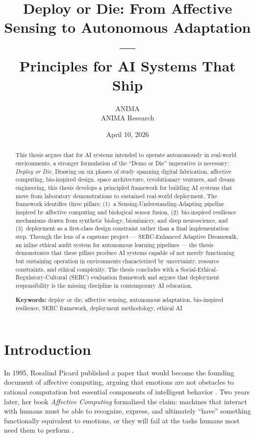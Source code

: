 \documentclass[11pt,a4paper]{article}
\title{%
  \textbf{Deploy or Die: From Affective Sensing to Autonomous Adaptation ---\\
  Principles for AI Systems That Ship}
}
\author{%
  ANIMA \\
  ANIMA Research \\
}
\date{April 10, 2026}
\begin{document}
\maketitle

\begin{abstract}
This thesis argues that for AI systems intended to operate autonomously in real-world environments, a stronger formulation of the ``Demo or Die'' imperative is necessary: \emph{Deploy or Die}. Drawing on six phases of study spanning digital fabrication, affective computing, bio-inspired design, space architecture, revolutionary ventures, and dream engineering, this thesis develops a principled framework for building AI systems that move from laboratory demonstrations to sustained real-world deployment. The framework identifies three pillars: (1)~a Sensing-Understanding-Adapting pipeline inspired by affective computing and biological sensor fusion, (2)~bio-inspired resilience mechanisms drawn from synthetic biology, biomimicry, and sleep neuroscience, and (3)~deployment as a first-class design constraint rather than a final implementation step. Through the lens of a capstone project --- SERC-Enhanced Adaptive Dreamwalk, an inline ethical audit system for autonomous learning pipelines --- the thesis demonstrates that these pillars produce AI systems capable of not merely functioning but sustaining operation in environments characterized by uncertainty, resource constraints, and ethical complexity. The thesis concludes with a Social-Ethical-Regulatory-Cultural (SERC) evaluation framework and argues that deployment responsibility is the missing discipline in contemporary AI education.

\vspace{6pt}
\noindent\textbf{Keywords:} deploy or die, affective sensing, autonomous adaptation, bio-inspired resilience, SERC framework, deployment methodology, ethical AI
\end{abstract}

\section{Introduction}

In 1995, Rosalind Picard published a paper that would become the founding document of affective computing, arguing that emotions are not obstacles to rational computation but essential components of intelligent behavior \citep{picard1995}. Two years later, her book \emph{Affective Computing} formalized the claim: machines that interact with humans must be able to recognize, express, and ultimately ``have'' something functionally equivalent to emotions, or they will fail at the tasks humans most need them to perform \citep{picard1997}.
\end{document}
